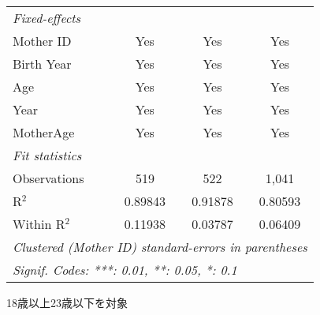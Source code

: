 \documentclass{article}
\begin{document}
\begin{landscape}
\begin{threeparttable}[b]
\begin{tabular}{lccc}
      \midrule
      \emph{Fixed-effects}\\
      Mother ID                                                          & Yes           & Yes      & Yes\\  
      Birth Year                                                         & Yes           & Yes      & Yes\\  
      Age                                                                & Yes           & Yes      & Yes\\  
      Year                                                               & Yes           & Yes      & Yes\\  
      MotherAge                                                          & Yes           & Yes      & Yes\\  
      \midrule
      \emph{Fit statistics}\\
      Observations                                                       & 519           & 522      & 1,041\\  
      R$^2$                                                              & 0.89843       & 0.91878  & 0.80593\\  
      Within R$^2$                                                       & 0.11938       & 0.03787  & 0.06409\\  
      \midrule \midrule
      \multicolumn{4}{l}{\emph{Clustered (Mother ID) standard-errors in parentheses}}\\
      \multicolumn{4}{l}{\emph{Signif. Codes: ***: 0.01, **: 0.05, *: 0.1}}\\
   \end{tabular}
   
   \begin{tablenotes}\item 18歳以上23歳以下を対象
   \end{tablenotes}
\end{threeparttable}
\par\endgroup


\end{landscape}
\end{document}
